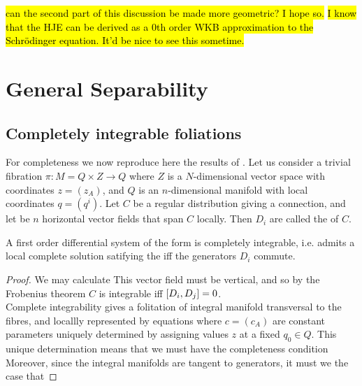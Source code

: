 \documentclass{article}
\begin{document}
\hl{can the second part of this discussion be made more geometric? I hope so. }
\hl{I know that the HJE can be derived as a 0th order WKB approximation to the Schr\"odinger equation. It'd be nice to see this sometime.}

\section{General Separability}

\subsection{Completely integrable foliations}
For completeness we now reproduce here the results of \cite{Benenti2002}. Let us consider a trivial fibration $\pi : M = Q \times Z \to Q$ where $Z$ is a $N$-dimensional vector space with coordinates $z = (z_A)$, and $Q$ is an $n$-dimensional manifold with local coordinates $q = (q^i)$. Let $C$ be a regular distribution giving a connection, and let 
be $n$ horizontal vector fields that span $C$ locally. Then $D_i$ are called the  of $C$. 
\begin{theorem}
A first order differential system of the form 
is completely integrable, i.e. admits a local complete solution satifying the 
iff the generators $D_i$ commute. 
\end{theorem}
\begin{proof}
We may calculate 
This vector field must be vertical, and so by the Frobenius theorem $C$ is integrable iff $\comm[D_i]{D_j}=0$. \\
Complete integrability gives a folitation of integral manifold transversal to the fibres, and locallly represented by equations 
where $c = (c_A)$ are constant parameters uniquely determined by assigning values $z$ at a fixed $q_0 \in Q$. This unique determination means that we must have the completeness condition
Moreover, since the integral manifolds are tangent to generators, it must we the case that 
\end{proof}
\end{document}
